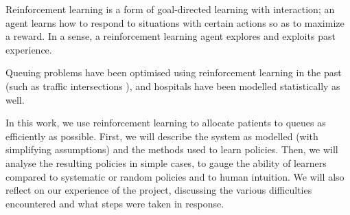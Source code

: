 \documentclass[11point]{article}
\begin{document}
Reinforcement learning is a form of goal-directed learning with interaction;
an agent learns how to respond to situations with certain actions so as to maximize a reward.
\cite{sutton2018reinforcement}
In a sense, a reinforcement learning agent explores and exploits past experience.

Queuing problems have been optimised using reinforcement learning in the past (such as traffic intersections \cite{soh2007modelling}), and hospitals have been modelled statistically as well. \cite{feng2018steady,Hagen2013}





In this work, we use reinforcement learning to allocate patients to queues as efficiently as possible.
First, we will describe the system as modelled (with simplifying assumptions) and the methods used to learn policies.
Then, we will analyse the resulting policies in simple cases, to gauge the ability of learners compared to systematic or random policies and to human intuition.
We will also reflect on our experience of the project, discussing the various difficulties encountered and what steps were taken in response.

\end{document}
